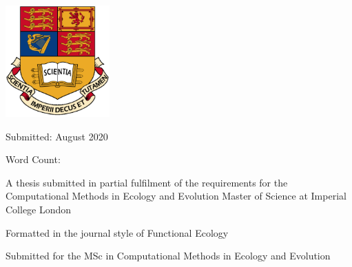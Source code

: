 \begin{titlepage}
	\vspace*{2\baselineskip} %
	
	
	
%	
%	
%	
%	
%	
%	
	

	
	
	\includegraphics[width = 4cm, keepaspectratio]{../images/IC_Crest-eps-converted-to.pdf}
	
	\vspace{0.3\baselineskip} %
	
	Submitted: August 2020 %
	
	
	
	\begin{center}
		Word Count: \wordcount
	\end{center}
	\vspace{0.5\baselineskip}
	
	A thesis submitted in partial fulfilment of the requirements for the Computational Methods in Ecology and Evolution Master of Science at Imperial College London
	\vspace{0.5\baselineskip}
	
	Formatted in the journal style of Functional Ecology	
	\vspace{0.5\baselineskip}
	
	Submitted for the MSc in Computational Methods in Ecology and Evolution
	
\end{titlepage}
